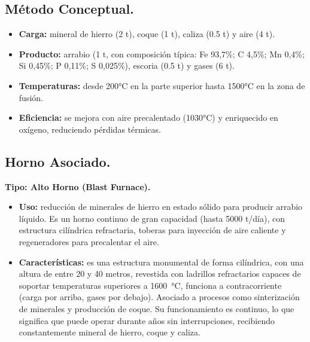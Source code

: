 \documentclass[12pt,a4paper]{article}
\begin{document}
\subsection{Método Conceptual.}

\begin{itemize}
    \item \textbf{Carga:} mineral de hierro (2 t), coque (1 t), caliza (0.5 t) y aire (4 t).
    \item \textbf{Producto:} arrabio (1 t, con composición típica: Fe 93,7\%; C 4,5\%; Mn 0,4\%; Si 0,45\%; P 0,11\%; S 0,025\%), escoria (0.5 t) y gases (6 t).
    \item \textbf{Temperaturas:} desde 200°C en la parte superior hasta 1500°C en la zona de fusión.
    \item \textbf{Eficiencia:} se mejora con aire precalentado (1030°C) y enriquecido en oxígeno, reduciendo pérdidas térmicas.
\end{itemize}

\subsection{Horno Asociado.} \label{alto_horno}

\textbf{Tipo: Alto Horno (Blast Furnace).}

\begin{itemize}
    \item \textbf{Uso:} reducción de minerales de hierro en estado sólido para producir arrabio líquido. Es un horno continuo de gran capacidad (hasta 5000 t/día), con estructura cilíndrica refractaria, toberas para inyección de aire caliente y regeneradores para precalentar el aire.
    \item \textbf{Características:} es una estructura monumental de forma cilíndrica, con una altura de entre 20 y 40 metros, revestida con ladrillos refractarios capaces de soportar temperaturas superiores a \SI{1600}{\celsius}, funciona a contracorriente (carga por arriba, gases por debajo). Asociado a procesos como sinterización de minerales y producción de coque. Su funcionamiento es continuo, lo que significa que puede operar durante años sin interrupciones, recibiendo constantemente mineral de hierro, coque y caliza.
\end{itemize}
\end{document}
